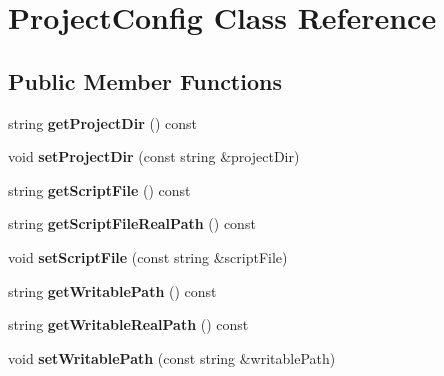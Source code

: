 \hypertarget{classProjectConfig}{}\section{Project\+Config Class Reference}
\label{classProjectConfig}
\subsection*{Public Member Functions}
\begin{DoxyCompactItemize}
\item 
\mbox{\label{classProjectConfig_a1c310fa57b51f1a5814687139fd8ef34}} 
string {\bfseries get\+Project\+Dir} () const
\item 
\mbox{\label{classProjectConfig_a236de63da9eb7f7504397faba5b8ba3e}} 
void {\bfseries set\+Project\+Dir} (const string \&project\+Dir)
\item 
\mbox{\label{classProjectConfig_a7a6778a0a55e0f2416da3c0bf5cd3ce8}} 
string {\bfseries get\+Script\+File} () const
\item 
\mbox{\label{classProjectConfig_a62a3784de7881f287ffdf802b8b64cc9}} 
string {\bfseries get\+Script\+File\+Real\+Path} () const
\item 
\mbox{\label{classProjectConfig_a437db139852cfe5b6261754216f40129}} 
void {\bfseries set\+Script\+File} (const string \&script\+File)
\item 
\mbox{\label{classProjectConfig_a0fed41ce7f9f3ac1f275f4f8d072abc6}} 
string {\bfseries get\+Writable\+Path} () const
\item 
\mbox{\label{classProjectConfig_ad0c5a0ab16bcc7d51347378badf389fb}} 
string {\bfseries get\+Writable\+Real\+Path} () const
\item 
\mbox{\label{classProjectConfig_a8c5a61f99f08dc24df7e71c6b120b538}} 
void {\bfseries set\+Writable\+Path} (const string \&writable\+Path)
\item 
\mbox{\label{classProjectConfig_a0d994ee2d8bfa382d8ad052a40e3fd14}} 

\end{DoxyCompactItemize}
